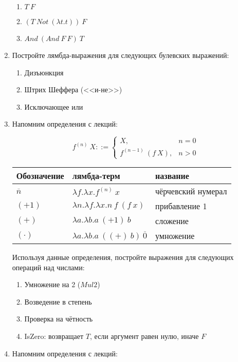 \documentclass[10pt,a4paper,oneside]{article}
\begin{document}
\begin{enumerate}
\begin{enumerate}
\item $T\ F$
\item $(T\ Not\ (\lambda t.t))\ F$
\item $And\ (And\ F\ F)\ T$
\end{enumerate}

\item Постройте лямбда-выражения для следующих булевских выражений:
\begin{enumerate}
\item Дизъюнкция
\item Штрих Шеффера (<<и-не>>)
\item Исключающее или
\end{enumerate}

\item Напомним определения с лекций:

$$f^{(n)}\ X ::= \left\{\begin{array}{ll} X, & n=0\\
                                f^{(n-1)}\ (f\ X), & n>0\end{array}\right.$$

\begin{center}\begin{tabular}{lll}
Обозначение & лямбда-терм & название\\\hline
$\overline{n}$ & $\lambda f.\lambda x.f^{(n)}\ x$ & чёрчевский нумерал\\
$(+1)$ & $\lambda n.\lambda f.\lambda x.n\ f\ (f\ x)$ & прибавление 1\\
$(+)$ & $\lambda a.\lambda b.a\ (+1)\ b$ & сложение\\
$(\cdot)$ & $\lambda a.\lambda b.a\ ((+)\ b)\ \overline{0}$ & умножение
\end{tabular}\end{center}

Используя данные определения, постройте выражения для следующих операций над числами:

\begin{enumerate}
\item Умножение на 2 ($Mul2$)
\item Возведение в степень
\item Проверка на чётность
\item IsZero: возвращает $T$, если аргумент равен нулю, иначе $F$
\end{enumerate}

\item Напомним определения с лекций:


\end{enumerate}
\end{document}
